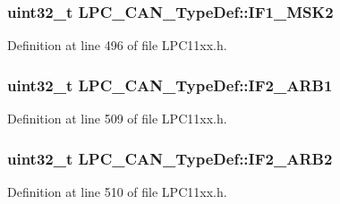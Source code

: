 \subsubsection[{\texorpdfstring{I\+F1\+\_\+\+M\+S\+K2}{IF1_MSK2}}]{ uint32\+\_\+t L\+P\+C\+\_\+\+C\+A\+N\+\_\+\+Type\+Def\+::\+I\+F1\+\_\+\+M\+S\+K2}\hypertarget{group___l_p_c11xx___definitions_ga455246305e2379030ba4d9bcdc28d219}{}\label{group___l_p_c11xx___definitions_ga455246305e2379030ba4d9bcdc28d219}


Definition at line 496 of file L\+P\+C11xx.\+h.

\subsubsection[{\texorpdfstring{I\+F2\+\_\+\+A\+R\+B1}{IF2_ARB1}}]{ uint32\+\_\+t L\+P\+C\+\_\+\+C\+A\+N\+\_\+\+Type\+Def\+::\+I\+F2\+\_\+\+A\+R\+B1}\hypertarget{group___l_p_c11xx___definitions_ga00e0f296ba765d6587677a2fecdd3692}{}\label{group___l_p_c11xx___definitions_ga00e0f296ba765d6587677a2fecdd3692}


Definition at line 509 of file L\+P\+C11xx.\+h.

\subsubsection[{\texorpdfstring{I\+F2\+\_\+\+A\+R\+B2}{IF2_ARB2}}]{ uint32\+\_\+t L\+P\+C\+\_\+\+C\+A\+N\+\_\+\+Type\+Def\+::\+I\+F2\+\_\+\+A\+R\+B2}\hypertarget{group___l_p_c11xx___definitions_ga0d05f7ebf62d51c6ab973c78e04cfa4f}{}\label{group___l_p_c11xx___definitions_ga0d05f7ebf62d51c6ab973c78e04cfa4f}


Definition at line 510 of file L\+P\+C11xx.\+h.

